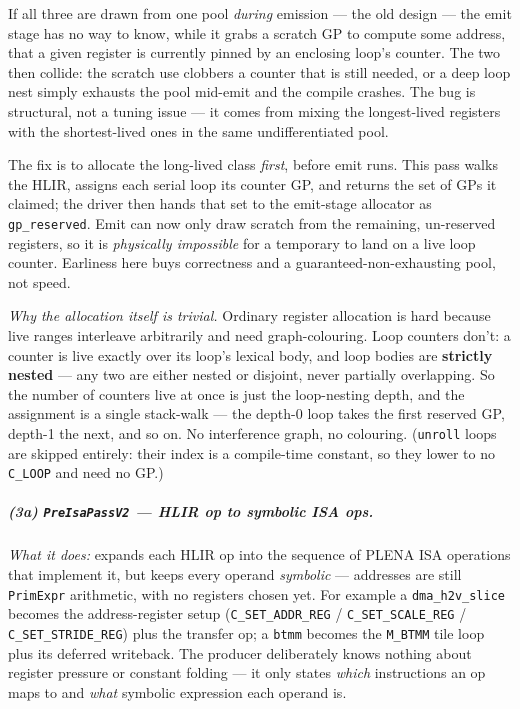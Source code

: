\documentclass[
  10pt,
]{article}
\begin{document}
If all three are drawn from one pool \emph{during} emission --- the old
design --- the emit stage has no way to know, while it grabs a scratch
GP to compute some address, that a given register is currently pinned by
an enclosing loop's counter. The two then collide: the scratch use
clobbers a counter that is still needed, or a deep loop nest simply
exhausts the pool mid-emit and the compile crashes. The bug is structural,
not a tuning issue --- it comes from mixing the longest-lived registers
with the shortest-lived ones in the same undifferentiated pool.

The fix is to allocate the long-lived class \emph{first}, before emit
runs. This pass walks the HLIR, assigns each serial loop its counter GP,
and returns the set of GPs it claimed; the driver then hands that set to
the emit-stage allocator as \texttt{gp\_reserved}. Emit can now only draw
scratch from the remaining, un-reserved registers, so it is
\emph{physically impossible} for a temporary to land on a live loop
counter. Earliness here buys correctness and a guaranteed-non-exhausting
pool, not speed.

\emph{Why the allocation itself is trivial.} Ordinary register allocation
is hard because live ranges interleave arbitrarily and need
graph-colouring. Loop counters don't: a counter is live exactly over its
loop's lexical body, and loop bodies are \textbf{strictly nested} --- any
two are either nested or disjoint, never partially overlapping. So the
number of counters live at once is just the loop-nesting depth, and the
assignment is a single stack-walk --- the depth-0 loop takes the first
reserved GP, depth-1 the next, and so on. No interference graph, no
colouring. (\texttt{unroll} loops are skipped entirely: their index is a
compile-time constant, so they lower to no \texttt{C\_LOOP} and need no
GP.)

\subparagraph{(3a) \texttt{PreIsaPassV2} --- HLIR op to symbolic ISA
ops.}\label{be-preisa} \emph{What it does:} expands each HLIR op into the
sequence of PLENA ISA operations that implement it, but keeps every
operand \emph{symbolic} --- addresses are still \texttt{PrimExpr}
arithmetic, with no registers chosen yet. For example a
\texttt{dma\_h2v\_slice} becomes the address-register setup
(\texttt{C\_SET\_ADDR\_REG} / \texttt{C\_SET\_SCALE\_REG} /
\texttt{C\_SET\_STRIDE\_REG}) plus the transfer op; a \texttt{btmm}
becomes the \texttt{M\_BTMM} tile loop plus its deferred writeback. The
producer deliberately knows nothing about register pressure or constant
folding --- it only states \emph{which} instructions an op maps to and
\emph{what} symbolic expression each operand is.
\end{document}
